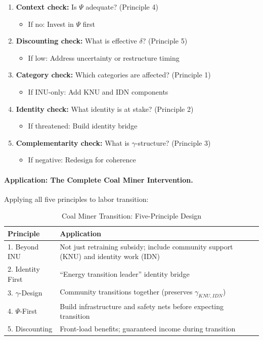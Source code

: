 \begin{enumerate}
\item \textbf{Context check:} Is $\Psi$ adequate? (Principle 4)
\begin{itemize}
\item If no: Invest in $\Psi$ first
\end{itemize}

\item \textbf{Discounting check:} What is effective $\delta$? (Principle 5)
\begin{itemize}
\item If low: Address uncertainty or restructure timing
\end{itemize}

\item \textbf{Category check:} Which categories are affected? (Principle 1)
\begin{itemize}
\item If INU-only: Add KNU and IDN components
\end{itemize}

\item \textbf{Identity check:} What identity is at stake? (Principle 2)
\begin{itemize}
\item If threatened: Build identity bridge
\end{itemize}

\item \textbf{Complementarity check:} What is $\gamma$-structure? (Principle 3)
\begin{itemize}
\item If negative: Redesign for coherence
\end{itemize}
\end{enumerate}

\paragraph{Application: The Complete Coal Miner Intervention.}
Applying all five principles to labor transition:

\begin{table}[htbp]
\centering
\caption{Coal Miner Transition: Five-Principle Design}
\label{tab:miner-five-principles}
\renewcommand{\arraystretch}{1.3}
\begin{tabular}{@{}lp{8cm}@{}}
\toprule
\textbf{Principle} & \textbf{Application} \\
\midrule
1. Beyond INU & Not just retraining subsidy; include community support (KNU) and identity work (IDN) \\
2. Identity First & ``Energy transition leader'' identity bridge \\
3. $\gamma$-Design & Community transitions together (preserves $\gamma_{KNU,IDN}$) \\
4. $\Psi$-First & Build infrastructure and safety nets before expecting transition \\
5. Discounting & Front-load benefits; guaranteed income during transition \\
\bottomrule
\end{tabular}
\end{table}

